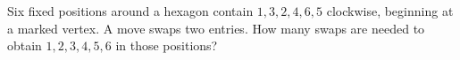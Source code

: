 Six fixed positions around a hexagon contain $1,3,2,4,6,5$ clockwise, beginning at a marked vertex. A move swaps two entries. How many swaps are needed to obtain $1,2,3,4,5,6$ in those positions?
